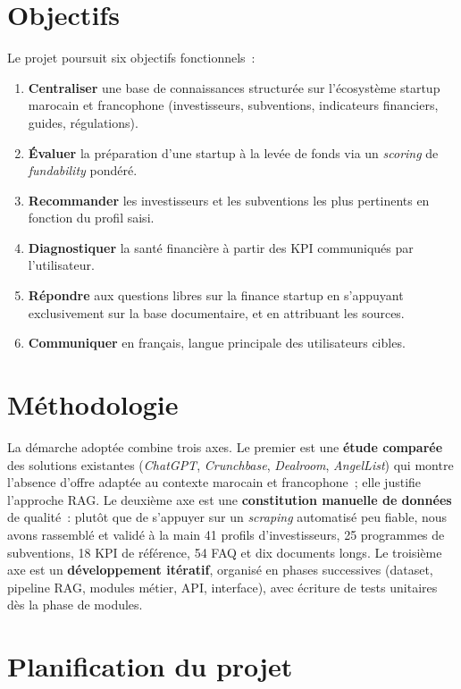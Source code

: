 \section*{Objectifs}

Le projet \tamwil{} poursuit six objectifs fonctionnels~:

\begin{enumerate}
  \item \textbf{Centraliser} une base de connaissances structurée sur l'écosystème startup marocain et francophone (investisseurs, subventions, indicateurs financiers, guides, régulations).
  \item \textbf{Évaluer} la préparation d'une startup à la levée de fonds via un \textit{scoring} de \textit{fundability} pondéré.
  \item \textbf{Recommander} les investisseurs et les subventions les plus pertinents en fonction du profil saisi.
  \item \textbf{Diagnostiquer} la santé financière à partir des \ac{KPI} communiqués par l'utilisateur.
  \item \textbf{Répondre} aux questions libres sur la finance startup en s'appuyant exclusivement sur la base documentaire, et en attribuant les sources.
  \item \textbf{Communiquer} en français, langue principale des utilisateurs cibles.
\end{enumerate}

\section*{Méthodologie}

La démarche adoptée combine trois axes. Le premier est une \textbf{étude comparée} des solutions existantes (\textit{ChatGPT}, \textit{Crunchbase}, \textit{Dealroom}, \textit{AngelList}) qui montre l'absence d'offre adaptée au contexte marocain et francophone~; elle justifie l'approche \ac{RAG}. Le deuxième axe est une \textbf{constitution manuelle de données} de qualité~: plutôt que de s'appuyer sur un \textit{scraping} automatisé peu fiable, nous avons rassemblé et validé à la main 41 profils d'investisseurs, 25 programmes de subventions, 18 \ac{KPI} de référence, 54 \ac{FAQ} et dix documents longs. Le troisième axe est un \textbf{développement itératif}, organisé en phases successives (dataset, pipeline \ac{RAG}, modules métier, \ac{API}, interface), avec écriture de tests unitaires dès la phase de modules.

\section*{Planification du projet}

